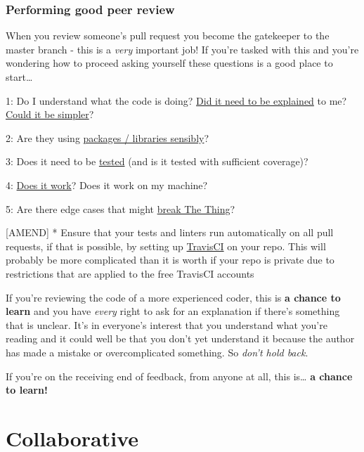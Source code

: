 \documentclass[]{book}
\begin{document}
\hypertarget{performing-good-peer-review}{%
\subsubsection*{Performing good peer review}\label{performing-good-peer-review}}

When you review someone's pull request you become the gatekeeper to the master branch - this is a \emph{very} important job! If you're tasked with this and you're wondering how to proceed asking yourself these questions is a good place to start\ldots{}

1: Do I understand what the code is doing? \protect\hyperlink{users}{Did it need to be explained} to me? \protect\hyperlink{ccc}{Could it be simpler}?

2: Are they using \protect\hyperlink{defaults}{packages / libraries sensibly}?

3: Does it need to be \protect\hyperlink{ccc}{tested} (and is it tested with sufficient coverage)?

4: \protect\hyperlink{ccc}{Does it work}? Does it work on my machine?

5: Are there edge cases that might \protect\hyperlink{errors}{break The Thing}?

{[}AMEND{]}
* Ensure that your tests and linters run automatically on all pull requests, if that is possible, by setting up \href{https://travis-ci.org/}{TravisCI} on your repo. This will probably be more complicated than it is worth if your repo is private due to restrictions that are applied to the free TravisCI accounts

If you're reviewing the code of a more experienced coder, this is \textbf{a chance to learn} and you have \emph{every} right to ask for an explanation if there's something that is unclear. It's in everyone's interest that you understand what you're reading and it could well be that you don't yet understand it because the author has made a mistake or overcomplicated something. So \emph{don't hold back}.

If you're on the receiving end of feedback, from anyone at all, this is\ldots{} \textbf{a chance to learn!}

\hypertarget{collaborate}{%
\section{Collaborative}\label{collaborate}}
\end{document}
